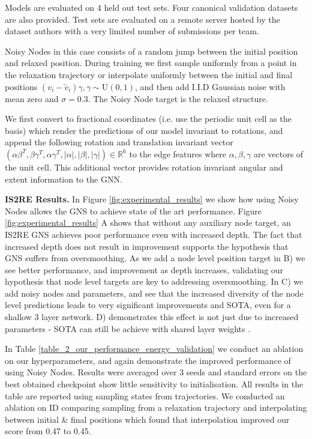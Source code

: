 \documentclass{article} \usepackage{iclr2022_conference,times}
\begin{document}
Models are evaluated on 4 held out test sets. Four canonical validation datasets are also provided. Test sets are evaluated on a remote server hosted by the dataset authors with a very limited number of submissions per team.

Noisy Nodes in this case consists of a random jump between the initial position and relaxed position. During training we first sample uniformly from a point in the relaxation trajectory or interpolate uniformly between the initial and final positions $(v_i - \tilde{v}_i)\gamma, \gamma \sim \text{U}(0, 1)$, and then add I.I.D Gaussian noise with mean zero and $\sigma = 0.3$. The Noisy Node target is the relaxed structure.

We first convert to fractional coordinates (i.e. use the periodic unit cell as the basis) which render the predictions of our model invariant to rotations, and append the following rotation and translation invariant vector $(\alpha\beta^T, \beta\gamma^T, \alpha\gamma^T, |\alpha|, |\beta|, |\gamma|) \in \mathbb{R}^6$ to the edge features where $\alpha, \beta, \gamma$ are vectors of the unit cell. This additional vector provides rotation invariant angular and extent information to the $\text{GNN}$.

\textbf{IS2RE Results.} In Figure \ref{fig:experimental_results} we show how using Noisy Nodes allows the GNS to achieve state of the art performance. Figure \ref{fig:experimental_results} A shows that without any auxiliary node target, an IS2RE GNS achieves poor performance even with increased depth. The fact that increased depth does not result in improvement supports the hypothesis that GNS suffers from oversmoothing. As we add a node level position target in B) we see better performance, and improvement as depth increases, validating our hypothesis that node level targets are key to addressing oversmoothing. In C) we add noisy nodes and parameters, and see that the increased diversity of the node level predictions leads to very significant improvements and SOTA, even for a shallow 3 layer network. D) demonstrates this effect is not just due to increased parameters - SOTA can still be achieve with shared layer weights .

In Table \ref{table_2_our_performance_energy_validation} we conduct an ablation on our hyperparameters, and again demonstrate the improved performance of using Noisy Nodes. Results were averaged over 3 seeds and standard errors on the best obtained checkpoint show little sensitivity to initialisation. All results in the table are reported using sampling states from trajectories. We conducted an ablation on ID comparing sampling from a relaxation trajectory and interpolating between initial \& final positions which found that interpolation improved our score from 0.47 to 0.45.
\end{document}
